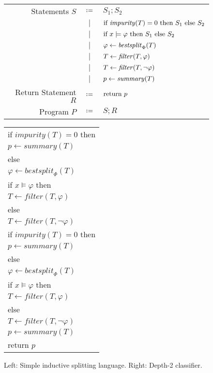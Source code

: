 \begin{figure}
\begin{minipage}{0.65\textwidth}
\centering
\begin{tabular}{rcl}
Statements $S$ & $\coloneqq$ & $S_1 ; S_2$ \\
& $\mid$ & $\iteimpuritynode{S_1}{S_2}$ \\
& $\mid$ & $\itemodelsnode{S_1}{S_2}$ \\
& $\mid$ & $\bestsplitnode$ \\
& $\mid$ & $\filternode$ \\
& $\mid$ & $\filternode[\lnot]$ \\
& $\mid$ & $\summarynode$ \\
Return Statement $R$ & $\coloneqq$ & $\returnnode$ \\
Program $P$ & $\coloneqq$ & $S ; R$
\end{tabular}
\end{minipage}
%
\begin{minipage}{0.3\textwidth}
\centering
\begin{tabular}{l}
if $\mathit{impurity}(T) = 0$ then \\
\quad $p \gets \mathit{summary}(T)$ \\
else \\
\quad $\varphi \gets \mathit{bestsplit}_\Phi(T)$ \\
\quad if $x \models \varphi$ then \\
\qquad $T \gets \mathit{filter}(T, \varphi)$ \\
\quad else \\
\qquad $T \gets \mathit{filter}(T, \lnot\varphi)$ \\
\quad if $\mathit{impurity}(T) = 0$ then \\
\qquad $p \gets \mathit{summary}(T)$ \\
\quad else \\
\qquad $\varphi \gets \mathit{bestsplit}_\Phi(T)$ \\
\qquad if $x \models \varphi$ then \\
\qquad\quad $T \gets \mathit{filter}(T, \varphi)$ \\
\qquad else \\
\qquad\quad $T \gets \mathit{filter}(T, \lnot \varphi)$ \\
\qquad $p \gets \mathit{summary}(T)$ \\
return $p$
\end{tabular}
\end{minipage}
\caption{Left: Simple inductive splitting language.
Right: Depth-2 classifier.}
\label{fig:dsl}
\end{figure}

